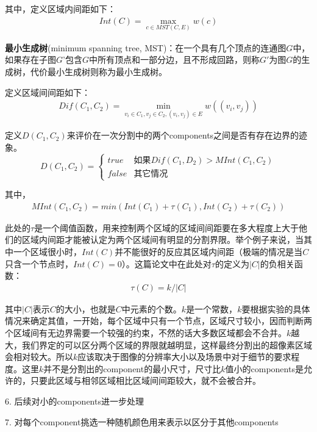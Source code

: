 \documentclass[12pt]{article}
\begin{document}
其中，定义区域内间距如下：
\begin{align}
Int(C) = \max_{c \in MST(C, E)}w(c)
\end{align}

\textbf{最小生成树}(minimum spanning tree, MST)：在一个具有几个顶点的连通图$G$中，如果存在子图$G$'包含$G$中所有顶点和一部分边，且不形成回路，则称$G'$为图$G$的生成树，代价最小生成树则称为最小生成树。

定义区域间间距如下：
\begin{align}
Dif(C_1, C_2) = \min_{v_i \in C_1, v_j \in C_2, (v_i, v_j)\in E}w((v_i, v_j))
\end{align}

定义$D(C_1, C_2)$来评价在一次分割中的两个components之间是否有存在边界的迹象。
\begin{equation}
 D(C_1, C_2)= \left\{
    \begin{array}{rl}
      true & \text{如果} Dif(C_1, D_2) > MInt(C_1, C_2)\\
      false & \text{其它情况}
    \end{array} \right.
\end{equation}

其中，
\begin{align}
MInt(C_1, C_2) = min(Int(C_1)+\tau(C_1), Int(C_2)+\tau(C_2))
\end{align}

此处的$\tau$是一个阈值函数，用来控制两个区域的区域间间距要在多大程度上大于他们的区域内间距才能被认定为两个区域间有明显的分割界限。举个例子来说，当其中一个区域很小时，$Int(C)$并不能很好的反应其区域内间距（极端的情况是当$C$只含一个节点时，$Int(C)=0$）。这篇论文中在此处对$\tau$的定义为$|C|$的负相关函数：
\begin{align}
\tau(C) = k/|C|
\end{align}

其中$|C|$表示$C$的大小，也就是$C$中元素的个数。$k$是一个常数，$k$要根据实验的具体情况来确定其值，一开始，每个区域中只有一个节点，区域尺寸较小，因而判断两个区域间有无边界需要一个较强的约束，不然的话大多数区域都会不合并。$k$越大，我们界定的可以区分两个区域的界限就越明显，这样最终分割出的超像素区域会相对较大。所以$k$应该取决于图像的分辨率大小以及场景中对于细节的要求程度。这里$k$并不是分割出的component的最小尺寸，尺寸比$k$值小的components是允许的，只要此区域与相邻区域相比区域间间距较大，就不会被合并。

6. 后续对小的components进一步处理

7. 对每个component挑选一种随机颜色用来表示以区分于其他components
\end{document}
